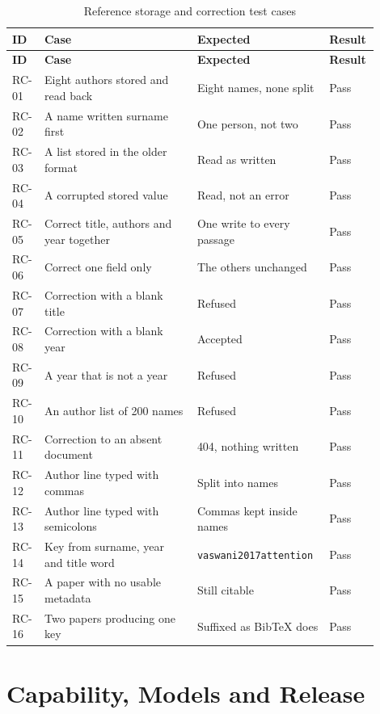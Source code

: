 \documentclass[12pt,a4paper]{report}
\begin{document}
\begin{longtable}{@{}p{0.07\linewidth}p{0.40\linewidth}p{0.33\linewidth}p{0.10\linewidth}@{}}
\caption{Reference storage and correction test cases}\label{tab:rc}\\
\toprule
\textbf{ID} & \textbf{Case} & \textbf{Expected} & \textbf{Result} \\
\midrule
\endfirsthead
\toprule
\textbf{ID} & \textbf{Case} & \textbf{Expected} & \textbf{Result} \\
\midrule
\endhead

RC-01 & Eight authors stored and read back & Eight names, none split & Pass \\
RC-02 & A name written surname first & One person, not two & Pass \\
RC-03 & A list stored in the older format & Read as written & Pass \\
RC-04 & A corrupted stored value & Read, not an error & Pass \\
RC-05 & Correct title, authors and year together & One write to every passage
  & Pass \\
RC-06 & Correct one field only & The others unchanged & Pass \\
RC-07 & Correction with a blank title & Refused & Pass \\
RC-08 & Correction with a blank year & Accepted & Pass \\
RC-09 & A year that is not a year & Refused & Pass \\
RC-10 & An author list of 200 names & Refused & Pass \\
RC-11 & Correction to an absent document & 404, nothing written & Pass \\
RC-12 & Author line typed with commas & Split into names & Pass \\
RC-13 & Author line typed with semicolons & Commas kept inside names & Pass \\
RC-14 & Key from surname, year and title word & \texttt{vaswani2017attention}
  & Pass \\
RC-15 & A paper with no usable metadata & Still citable & Pass \\
RC-16 & Two papers producing one key & Suffixed as BibTeX does & Pass \\
\bottomrule
\end{longtable}

\section{Capability, Models and Release}
\end{document}
